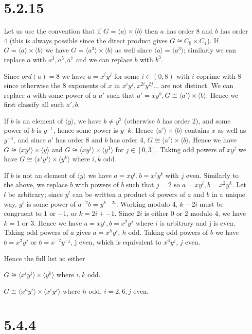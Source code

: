 \documentclass{article}
\def\<{\langle}
\def\>{\rangle}
\def\inv{{-1}}
\begin{document}
\section*{5.2.15}

Let us use the convention that if $G = \<a\> \times \<b\>$ then $a$ has order 8 and $b$ has order 4 (this is always possible since the direct product gives $G \cong C_8 \times C_4$). If $G = \<a\> \times \<b\>$ we have $G = \<a^3\> \times \<b\>$ as well since $\<a\> = \<a^3\>$; similarly we can replace $a$ with $a^3, a^5, a^7$ and we can replace $b$ with $b^3$. 

Since $ord(a) = 8$ we have $a = x^iy^j$ for some $i \in (0, 8)$ with $i$ coprime with $8$ since otherwise the 8 exponents of $x$ in $x^iy^j, x^{2i}y^{2j} \ldots$ are not distinct. We can replace $a$ with some power of a $a'$ such that $a' = xy^k, G \cong \<a'\> \times \<b\>$. Hence we first classify all such $a', b$.

If $b$ is an element of $\<y\>$, we have $b \ne y^2$ (otherwise $b$ has order 2), and some power of $b$ is $y^\inv$, hence some power is $y^-k$. Hence $\<a'\> \times \<b\>$ contains $x$ as well as $y^\inv$, and since $a'$ has order 8 and $b$ has order 4, $G \cong \<a'\> \times \<b\>$. Hence we have $G \cong \<xy^j\> \times \<y\>$ and $G \cong \<xy^j\> \times \<y^3\>$ for $j \in [0, 3]$. Taking odd powers of $xy^j$ we have $G \cong \<x^iy^j\> \times \<y^k\>$ where $i, k$ odd.

If $b$ is not an element of $\<y\>$ we have $a = xy^i, b = x^jy^k$ with $j$ even. Similarly to the above, we replace $b$ with powers of $b$ such that $j = 2$ so $a = xy^i, b = x^2y^k$. Let $l$ be arbitrary; since $y^l$ can be written a product of powers of $a$ and $b$ in a unique way, $y^l$ is some power of $a^{-2}b = y^{k-2i}$. Working modulo 4, $k-2i$ must be congruent to $1$ or $-1$, or $k = 2i +- 1$. Since $2i$ is either 0 or 2 modulo 4, we have $k = 1$ or 3. Hence we have $a = xy^i, b=x^2y^j$ where $i$ is arbitrary and j is even. Taking odd powers of $a$ gives $a = x^hy^i$, $h$ odd. Taking odd powers of $b$ we have $b = x^2y^j$ or $b = x^{-2}y^{-j}$, j even, which is equivalent to $x^6y^j$, $j$ even.

Hence the full list is: either

$G \cong \<x^iy^j\> \times \<y^k\>$ where $i, k$ odd.

$G \cong \<x^hy^i\> \times \<x^iy^j\>$ where $h$ odd, $i = 2,6, j$ even.

\section*{5.4.4}
\end{document}
